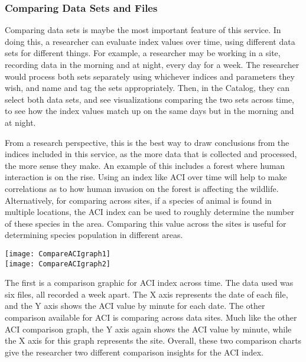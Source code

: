 \subsubsection{Comparing Data Sets and Files}
Comparing data sets is maybe the most important feature of this service. In doing this, a researcher can evaluate index values over time, using different data sets for different things. For example, a researcher may be working in a site, recording data in the morning and at night, every day for a week. The researcher would process both sets separately using whichever indices and parameters they wish, and name and tag the sets appropriately. Then, in the Catalog, they can select both data sets, and see visualizations comparing the two sets across time, to see how the index values match up on the same days but in the morning and at night.\par
From a research perspective, this is the best way to draw conclusions from the indices included in this service, as the more data that is collected and processed, the more sense they make. An example of this includes a forest where human interaction is on the rise. Using an index like ACI over time will help to make correlations as to how human invasion on the forest is affecting the wildlife. Alternatively, for comparing across sites, if a species of animal is found in multiple locations, the ACI index can be used to roughly determine the number of these species in the area. Comparing this value across the sites is useful for determining species population in different areas.\\

\begin{center}
	\texttt{[image: CompareACIgraph1]} \\[12pt]
	\texttt{[image: CompareACIgraph2]} \\[12pt]
\end{center}

The first is a comparison graphic for ACI index across time. The data used was six files, all recorded a week apart. The X axis represents the date of each file, and the Y axis shows the ACI value by minute for each date. The other comparison available for ACI is comparing across data sites. Much like the other ACI comparison graph, the Y axis again shows the ACI value by minute, while the X axis for this graph represents the site. Overall, these two comparison charts give the researcher two different comparison insights for the ACI index.\\

